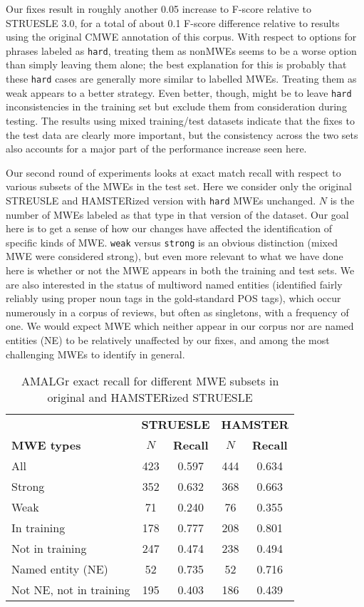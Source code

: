 \documentclass[output=paper
,modfonts
,nonflat]{langsci/langscibook}
\newcommand{\mwetype}[1]{\texttt{#1}\xspace}
\newcommand{\strongish}{\mwetype{strong}}
\newcommand{\weak}{\mwetype{weak}}
\newcommand{\hard}{\mwetype{hard}}
\newcommand{\zp}{\phantom{0}}
\begin{document}
Our fixes result in roughly another 0.05 increase to F-score relative to STRUESLE 3.0, for a total of about 0.1 F-score difference relative to results using the original CMWE annotation of this corpus. With respect to options for phrases labeled as \hard, treating them as nonMWEs seems to be a worse option than simply leaving them alone; the best explanation for this is probably that these \hard cases are generally more similar to labelled MWEs. Treating them as weak appears to a better strategy. Even better, though, might be to leave \hard inconsistencies in the training set but exclude them from consideration during testing. The results using mixed training/test datasets indicate that the fixes to the test data are clearly more important, but the consistency across the two sets also accounts for a major part of the performance increase seen here.

Our second round of experiments looks at exact match recall with respect to various subsets of the MWEs in the test set. Here we consider only the original STREUSLE and HAMSTERized version with \hard MWEs unchanged. $N$ is the number of MWEs labeled as that type in that version of the dataset. Our goal here is to get a sense of how our changes have affected the identification of specific kinds of MWE. \weak versus \strongish is an obvious distinction (mixed MWE were considered strong), but even more relevant to what we have done here is whether or not the MWE appears in both the training and test sets. We are also interested in the status of multiword named entities (identified fairly reliably using proper noun tags in the gold-standard POS tags), which occur numerously in a corpus of reviews, but often as singletons, \ie with a frequency of one. We would expect MWE which neither appear in our corpus nor are named entities (NE) to be relatively unaffected by our fixes, and among the most challenging MWEs to identify in general.


\begin{table*}[t!]
\begin{tabular}{l c c c c}
\toprule
&\multicolumn{2}{c}{\textbf{STRUESLE}} & \multicolumn{2}{c}{\textbf{HAMSTER}} \\
\textbf{MWE types}& \textbf{$N$}& \textbf{Recall}& \textbf{$N$} & \textbf{Recall} \\
\midrule
All & 423 & 0.597 & 444 & 0.634\\
\midrule
Strong &  352 & 0.632 & 368 & 0.663\\
Weak & \zp71& 0.240 & \zp76 & 0.355 \\
\midrule
In training & 178 & 0.777 & 208 & 0.801 \\ 
Not in training & 247 & 0.474 & 238 & 0.494 \\
\midrule
Named entity (NE)& \zp52 & 0.735 & \zp52 & 0.716 \\
Not NE, not in training & 195& 0.403 & 186& 0.439\\
\bottomrule
\end{tabular}%
\caption{AMALGr exact recall for different MWE subsets in original and HAMSTERized STRUESLE} %
\label{tab:exp2} %
\end{table*}
\end{document}
